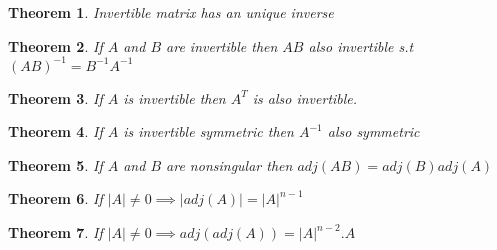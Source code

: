 \documentclass[12pt]{article}
\newtheorem{thm}{Theorem}
\begin{document}
\begin{thm}\normalfont
	Invertible matrix has an unique inverse
\end{thm}
\begin{thm}\normalfont
	If $A$ and $B$ are invertible then  $AB$ also invertible s.t $(AB)^{-1}= B^{-1}A^{-1}$
\end{thm}
\begin{thm}\normalfont
 If $A$ is invertible then $A^T$ is also invertible.
\end{thm}
\begin{thm}\normalfont
If $A$ is invertible symmetric then $A^{-1} $ also symmetric
\end{thm}
\begin{thm}\normalfont
 If $A$ and $B$ are nonsingular then $adj(AB) = adj(B)adj(A)$
\end{thm}
\begin{thm}\normalfont
 If $|A |\not= 0 \implies |adj(A) |= |A|^{n-1}$
\end{thm}
\begin{thm}\normalfont
	If $|A|\not= 0 \implies adj(adj(A)) = |A|^{n-2}.A$
\end{thm}
\end{document}
